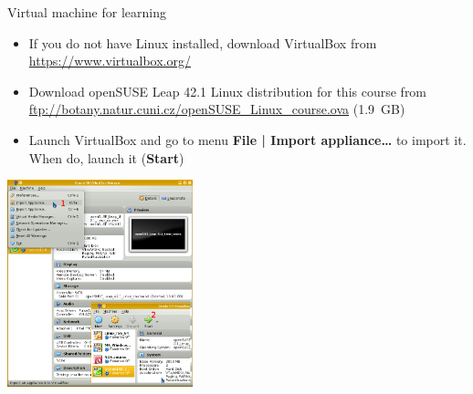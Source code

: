 \documentclass[compress, ucs, xelatex, 11pt, xcolor=svgnames,
  hyperref={
    bookmarks=true,
    unicode=true,
    colorlinks=true,
    pdftitle={Linux, command line and MetaCentrum},
    plainpages=false,
    pdfauthor={Vojtech Zeisek},
    pdfsubject={Course about use of Linux command line, writing shell scripts and using MetaCentrum of CESNET},
    pdfcreator={XeLaTeX},
    pdfkeywords={Linux, GNU, BASH, shell, command line, MetaCentrum},
    linkcolor=Red,
    anchorcolor=Blue,
    citecolor=Purple,
    filecolor=DodgerBlue,
    menucolor=DarkOrchid,
    urlcolor=DeepSkyBlue,
    pdftex},
  url={hyphens, lowtilde} %
  ]{beamer}
\begin{document}
\begin{frame}{Virtual machine for learning}
  \begin{multicols}{2}
    \begin{itemize}
      \item If you do not have Linux installed, download VirtualBox from \url{https://www.virtualbox.org/}
      \item Download openSUSE Leap 42.1 Linux distribution for this course from \url{ftp://botany.natur.cuni.cz/openSUSE_Linux_course.ova} (1.9~GB)
      \item Launch VirtualBox and go to menu \textbf{File | Import appliance\ldots} to import it. When do, launch it (\textbf{Start})
    \end{itemize}
    \includegraphics[height=6cm]{virtualbox.png}
  \end{multicols}
\end{frame}
\end{document}
